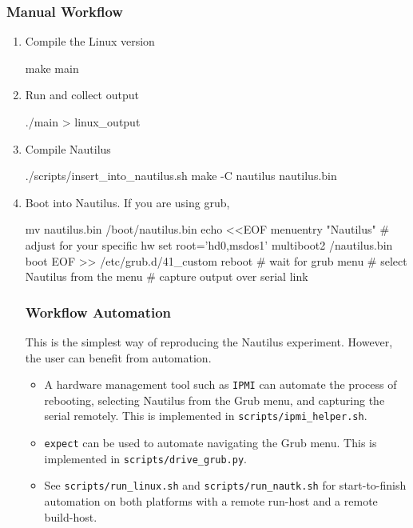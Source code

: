 \documentclass{IEEEtran}
\begin{document}
\subsubsection{Manual Workflow}

\begin{enumerate}[leftmargin=1cm]
\item Compile the Linux version
  \begin{shellcode}
    make main
  \end{shellcode}

\item Run and collect output
  \begin{shellcode}
    ./main > linux_output
  \end{shellcode}

\item Compile Nautilus
  \begin{shellcode}
    ./scripts/insert_into_nautilus.sh
    make -C nautilus nautilus.bin
  \end{shellcode}

\item Boot into Nautilus. If you are using grub, 
  \begin{shellcode}
    mv nautilus.bin /boot/nautilus.bin
    echo <<EOF
    menuentry "Nautilus" {
      # adjust for your specific hw
      set root='hd0,msdos1'
      multiboot2 /nautilus.bin
      boot
    }
    EOF >> /etc/grub.d/41_custom
    reboot
    # wait for grub menu
    # select Nautilus from the menu
    # capture output over serial link
  \end{shellcode}

\subsubsection{Workflow Automation}

This is the simplest way of reproducing the Nautilus experiment. However, the user can benefit from automation.

\begin{itemize}
\item A hardware management tool such as \texttt{IPMI} can automate the process of rebooting, selecting Nautilus from the Grub menu, and capturing the serial remotely. This is implemented in \texttt{scripts/ipmi\_helper.sh}.
\item \texttt{expect} can be used to automate navigating the Grub menu. This is implemented in \texttt{scripts/drive\_grub.py}.
\item See \texttt{scripts/run\_linux.sh} and \texttt{scripts/run\_nautk.sh} for start-to-finish automation on both platforms with a remote run-host and a remote build-host.
\end{itemize}

\end{enumerate}
\end{document}
